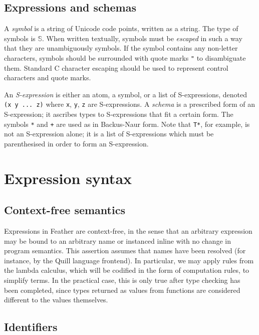 \documentclass[11pt]{book}
\begin{document}
\subsection{Expressions and schemas}
\begin{defn}
    A \textit{symbol} is a string of Unicode code points, written as a string.
    The type of symbols is \( \mathbb S \).
    When written textually, symbols must be \textit{escaped} in such a way that they are unambiguously symbols.
    If the symbol contains any non-letter characters, symbols should be surrounded with quote marks \lstinline{"} to disambiguate them.
    Standard C character escaping should be used to represent control characters and quote marks.
\end{defn}
\begin{defn}
    An \textit{S-expression} is either an atom, a symbol, or a list of S-expressions, denoted \lstinline{(x y ... z)} where \lstinline{x}, \lstinline{y}, \lstinline{z} are S-expressions.
    A \textit{schema} is a prescribed form of an S-expression; it ascribes types to S-expressions that fit a certain form.
    The symbols \lstinline{*} and \lstinline{+} are used as in Backus-Naur form.
    Note that \lstinline{T*}, for example, is not an S-expression alone; it is a list of S-expressions which must be parenthesised in order to form an S-expression.
\end{defn}

\section{Expression syntax}

\subsection{Context-free semantics}

Expressions in Feather are context-free, in the sense that an arbitrary expression may be bound to an arbitrary name or instanced inline with no change in program semantics.
This assertion assumes that names have been resolved (for instance, by the Quill language frontend).
In particular, we may apply rules from the lambda calculus, which will be codified in the form of computation rules, to simplify terms.
In the practical case, this is only true after type checking has been completed, since types returned as values from functions are considered different to the values themselves.

\subsection{Identifiers}
\end{document}
